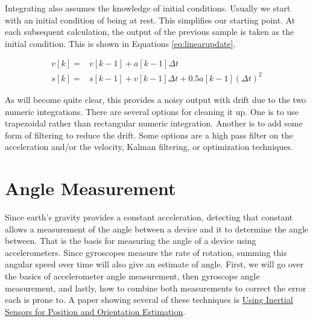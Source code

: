 Integrating also assumes the knowledge of initial conditions. Usually we start with an initial condition of 
being at rest. This simplifies our starting point. At each subsequent calculation, the output of the previous
sample is taken as the initial condition. This is shown in Equations \ref{eq:linearupdate}.

\begin{subequations}
	\label{eq:linearupdate}
	\begin{align}
		v[k] =& v[k-1] + a[k-1]\Delta t \\
		s[k] =& s[k-1] + v[k-1]\Delta t + 0.5a[k-1](\Delta t)^2
	\end{align}
\end{subequations}

As will become quite clear, this provides a noisy output with drift due to the two numeric integrations.
There are several options for cleaning it up. One is to use trapezoidal rather than rectangular
numeric integration. Another is to add some form of filtering to reduce the drift. Some options are
a high pass filter on the acceleration and/or the velocity, Kalman filtering, or optimization techniques.


\section{Angle Measurement}
Since earth's gravity provides a constant acceleration, detecting that constant allows a measurement of the 
angle between a device and it to determine the angle between. That is the basis for measuring the angle 
of a device using accelerometers. Since gyroscopes measure the rate of rotation, summing this angular
speed over time will also give an estimate of angle. First, we will go over the basics of accelerometer 
angle measurement, then gyroscope angle measurement, and lastly, how to combine both measurements to correct
the error each is prone to. A paper showing several of these techniques is 
\href{https://arxiv.org/pdf/1704.06053.pdf}{Using Inertial Sensors for Position
and Orientation Estimation}.

